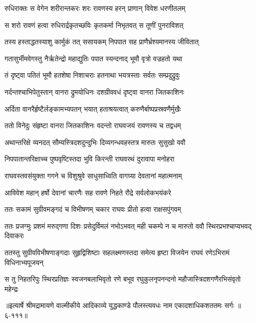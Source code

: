 \twolineshloka
{रुधिराक्तः स वेगेन शरीरान्तकरः शरः}
{रावणस्य हरन् प्राणान् विवेश धरणीतलम्} %

\twolineshloka
{स शरो रावणं हत्वा रुधिरार्द्रकृतच्छविः}
{कृतकर्मा निभृतवत् स तूणीं पुनराविशत्} %

\twolineshloka
{तस्य हस्ताद्धतस्याशु कार्मुकं तत् ससायकम्}
{निपपात सह प्राणैर्भ्रश्यमानस्य जीवितात्} %

\twolineshloka
{गतासुर्भीमवेगस्तु नैर्ऋतेन्द्रो महाद्युतिः}
{पपात स्यन्दनाद् भूमौ वृत्रो वज्रहतो यथा} %

\twolineshloka
{तं दृष्ट्वा पतितं भूमौ हतशेषा निशाचराः}
{हतनाथा भयत्रस्ताः सर्वतः सम्प्रदुद्रुवुः} %

\twolineshloka
{नर्दन्तश्चाभिपेतुस्तान् वानरा द्रुमयोधिनः}
{दशग्रीववधं दृष्ट्वा वानरा जितकाशिनः} %

\twolineshloka
{अर्दिता वानरैर्हृष्टैर्लङ्कामभ्यपतन् भयात्}
{हताश्रयत्वात् करुणैर्बाष्पप्रस्रवणैर्मुखैः} %

\twolineshloka
{ततो विनेदुः संहृष्टा वानरा जितकाशिनः}
{वदन्तो राघवजयं रावणस्य च तद्वधम्} %

\twolineshloka
{अथान्तरिक्षे व्यनदत् सौम्यस्त्रिदशदुन्दुभिः}
{दिव्यगन्धवहस्तत्र मारुतः सुसुखो ववौ} %

\twolineshloka
{निपपातान्तरिक्षाच्च पुष्पवृष्टिस्तदा भुवि}
{किरन्ती राघवरथं दुरावापा मनोहरा} %

\twolineshloka
{राघवस्तवसंयुक्ता गगने च विशुश्रुवे}
{साधुसाध्विति वागग्र्या देवतानां महात्मनाम्} %

\twolineshloka
{आविवेश महान् हर्षो देवानां चारणैः सह}
{रावणे निहते रौद्रे सर्वलोकभयंकरे} %

\twolineshloka
{ततः सकामं सुग्रीवमङ्गदं च विभीषणम्}
{चकार राघवः प्रीतो हत्वा राक्षसपुंगवम्} %

\twolineshloka
{ततः प्रजग्मुः प्रशमं मरुद्गणा दिशः प्रसेदुर्विमलं नभोऽभवत्}
{मही चकम्पे न च मारुतो ववौ स्थिरप्रभश्चाप्यभवद् दिवाकरः} %

\twolineshloka
{ततस्तु सुग्रीवविभीषणाङ्गदाः सुहृद्विशिष्टाः सहलक्ष्मणस्तदा}
{समेत्य हृष्टा विजयेन राघवं रणेऽभिरामं विधिनाभ्यपूजयन्} %

\twolineshloka
{स तु निहतरिपुः स्थिरप्रतिज्ञः स्वजनबलाभिवृतो रणे बभूव}
{रघुकुलनृपनन्दनो महौजास्त्रिदशगणैरभिसंवृतो महेन्द्रः} %


॥इत्यार्षे श्रीमद्रामायणे वाल्मीकीये आदिकाव्ये युद्धकाण्डे पौलस्त्यवधः नाम एकादशाधिकशततमः सर्गः ॥६-१११॥
